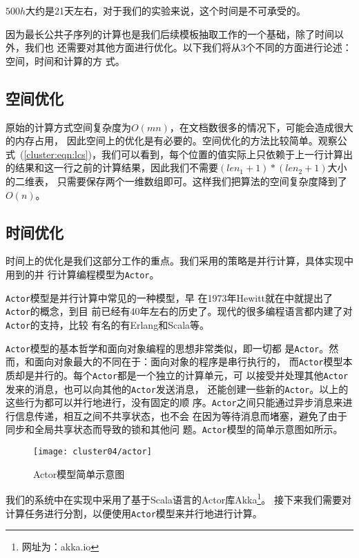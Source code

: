 $500h$大约是21天左右，对于我们的实验来说，这个时间是不可承受的。

因为最长公共子序列的计算也是我们后续模板抽取工作的一个基础，除了时间以外，我们也
还需要对其他方面进行优化。以下我们将从3个不同的方面进行论述：空间，时间和计算的方
式。

\subsection{空间优化}
原始的计算方式空间复杂度为$O(mn)$，在文档数很多的情况下，可能会造成很大的内存占用，
因此空间上的优化是有必要的。空间优化的方法比较简单。观察公
式~(\ref{cluster:eqn:lcs})，我们可以看到，每个位置的值实际上只依赖于上一行计算出
的结果和这一行之前的计算结果，因此我们不需要$(len_1 + 1)* (len_2+1)$大小的二维表，
只需要保存两个一维数组即可。这样我们把算法的空间复杂度降到了$O(n)$。

\subsection{时间优化}
时间上的优化是我们这部分工作的重点。我们采用的策略是并行计算，具体实现中用到的并
行计算编程模型为\texttt{Actor}。

\texttt{Actor}模型是并行计算中常见的一种模型，早
在1973年Hewitt就在\cite{hewitt1973universal}中就提出了\texttt{Actor}的概念，到目
前已经有40年左右的历史了。现代的很多编程语言都内建了对\texttt{Actor}的支持，比较
有名的有Erlang和Scala等。

\texttt{Actor}模型的基本哲学和面向对象编程的思想非常类似，即一切都
是\texttt{Actor}。然而，和面向对象最大的不同在于：面向对象的程序是串行执行的，
而\texttt{Actor}模型本质却是并行的。每个\texttt{Actor}都是一个独立的计算单元，可
以接受并处理其他\texttt{Actor}发来的消息，也可以向其他的\texttt{Actor}发送消息，
还能创建一些新的\texttt{Actor}。以上的这些行为都可以并行地进行，没有固定的顺
序。\texttt{Actor}之间只能通过异步消息来进行信息传递，相互之间不共享状态，也不会
在因为等待消息而堵塞，避免了由于同步和全局共享状态而导致的锁和其他问
题。\texttt{Actor}模型的简单示意图如所示。

\begin{figure}
  \centering
  \texttt{[image: cluster04/actor]}
  \caption{Actor模型简单示意图}
  \label{cluster:fig:actor}
\end{figure}

我们的系统中在实现中采用了基于Scala语言的Actor库Akka\footnote{网址为：akka.io}。
接下来我们需要对计算任务进行分割，以便使用\texttt{Actor}模型来并行地进行计算。


